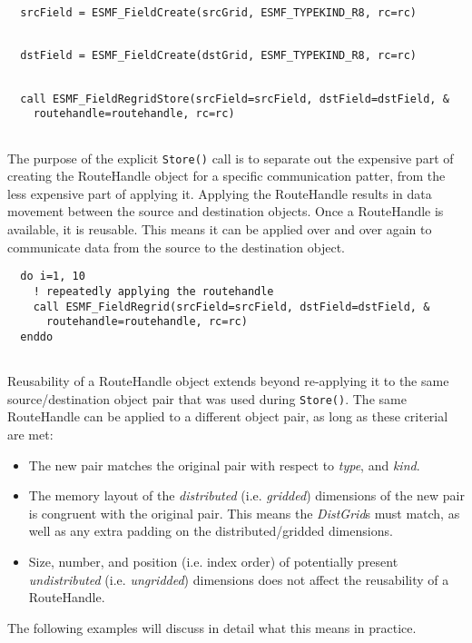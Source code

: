  \begin{verbatim}
  srcField = ESMF_FieldCreate(srcGrid, ESMF_TYPEKIND_R8, rc=rc)
 
\end{verbatim}
 

 \begin{verbatim}
  dstField = ESMF_FieldCreate(dstGrid, ESMF_TYPEKIND_R8, rc=rc)
 
\end{verbatim}
 

 \begin{verbatim}
  call ESMF_FieldRegridStore(srcField=srcField, dstField=dstField, &
    routehandle=routehandle, rc=rc)
 
\end{verbatim}
 

   The purpose of the explicit {\tt Store()} call is to separate out the 
   expensive part of creating the RouteHandle object for a specific
   communication patter, from the less expensive part of applying it.
   Applying the RouteHandle results in data movement between 
   the source and destination objects. Once a RouteHandle is available, it is
   reusable. This means it can be applied over and over again to communicate
   data from the source to the destination object. 

 \begin{verbatim}
  do i=1, 10
    ! repeatedly applying the routehandle
    call ESMF_FieldRegrid(srcField=srcField, dstField=dstField, &
      routehandle=routehandle, rc=rc)
  enddo
 
\end{verbatim}
 

   Reusability of a RouteHandle object extends beyond re-applying it to the same
   source/destination object pair that was used during {\tt Store()}. The same
   RouteHandle can be applied to a different object pair, as long as these
   criterial are met:
   \begin{itemize}
   \item The new pair matches the original pair with respect to {\em type}, 
     and {\em kind}.
   \item The memory layout of the {\em distributed} (i.e. {\em gridded}) 
     dimensions of the new pair is congruent with the original pair. This means
     the {\em DistGrid}s must match, as well as any extra padding on the 
     distributed/gridded dimensions.
   \item Size, number, and position (i.e. index order) of potentially present
     {\em undistributed} (i.e. {\em ungridded}) dimensions does not affect the
     reusability of a RouteHandle.
   \end{itemize}
   The following examples will discuss in detail what this means in practice.
  
